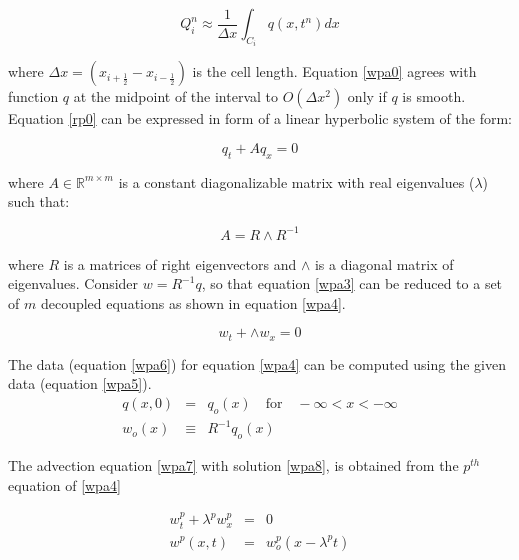 \documentclass[12pt,a4paper]{article}
\begin{document}
    \begin{equation}
    	Q_{i}^{n} \approx \dfrac{1}{\Delta x} \int_{C_{i}}q(x,t^{n})dx
    	\label{wpa0}
    \end{equation}
    
   \noindent  where  $\Delta x = (x_{i+\frac{1}{2}} - x_{i-\frac{1}{2}})$ is the cell length. Equation \eqref{wpa0} agrees with function $q$ at the midpoint of the interval to $O(\Delta x^{2})$ only if  $q$ is smooth.\\
   
  \noindent  Equation \eqref{rp0} can be expressed in form of a linear hyperbolic system of the form:
   
   \begin{equation}
   		q_{t} + Aq_{x} = 0
   		\label{wpa3}
   \end{equation}

\noindent where $A \in \mathbb{R}^{m\times m}$ is a constant diagonalizable matrix with real eigenvalues ($\lambda$) such that:

\begin{equation}
	A = R \wedge R^{-1}
\end{equation}
   
  \noindent where $R$ is a matrices of right eigenvectors and  $\wedge$  is a diagonal matrix of eigenvalues. Consider $w = R^{-1}q$, so that equation \eqref{wpa3} can be reduced to a set of $m$ decoupled equations as shown in equation \eqref{wpa4}.
  
  \begin{equation}
  	w_{t} + \wedge w_{x} = 0
  	\label{wpa4}
  \end{equation}
  
  \noindent The  data (equation \eqref{wpa6}) for equation \eqref{wpa4} can be computed using the given data (equation \eqref{wpa5}).
  \begin{eqnarray}
  	q(x,0)& =& q_{o} (x) \quad \text{for} \quad - \infty < x < - \infty 
  	\label{wpa5}\\
  	w_{o} (x) &\equiv& R^{-1} q_{o}(x)
  	\label{wpa6}
  \end{eqnarray}
  
  \noindent The advection equation \eqref{wpa7} with solution \eqref{wpa8}, is obtained from the $p^{th}$ equation of \eqref{wpa4}
  
  
  \begin{eqnarray}
  	w_{t}^{p} + \lambda^{p} w_{x}^{p} &=& 0
  	\label{wpa7}\\
  	w^{p} (x,t) &=& w_{o}^{p} (x-\lambda^{p}t)
  		\label{wpa8}
  \end{eqnarray}
   
\end{document}
